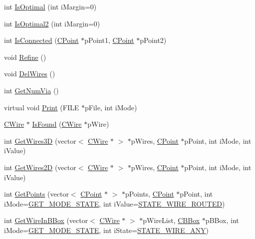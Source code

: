 \begin{DoxyCompactItemize}
\item 
int \mbox{\hyperlink{classCNet_af4f036ca5e1729d4d85130547b7d0e85}{Is\+Optimal}} (int i\+Margin=0)
\item 
int \mbox{\hyperlink{classCNet_adcd99220d0eb0a6c4f64577ff57a010e}{Is\+Optimal2}} (int i\+Margin=0)
\item 
int \mbox{\hyperlink{classCNet_a911d486b626482b3893076ec39c312e6}{Is\+Connected}} (\mbox{\hyperlink{classCPoint}{C\+Point}} $\ast$p\+Point1, \mbox{\hyperlink{classCPoint}{C\+Point}} $\ast$p\+Point2)
\item 
void \mbox{\hyperlink{classCNet_ab63bb6fcabe98cabe6c02f525c937aec}{Refine}} ()
\item 
void \mbox{\hyperlink{classCNet_a5836b8ada69984cf346e6a41bd536b86}{Del\+Wires}} ()
\item 
int \mbox{\hyperlink{classCNet_abd9060bc972528e75eb26cabeceba261}{Get\+Num\+Via}} ()
\item 
virtual void \mbox{\hyperlink{classCNet_a94a51f1ccadf689a3bcfa167f37e12f5}{Print}} (F\+I\+LE $\ast$p\+File, int i\+Mode)
\item 
\mbox{\hyperlink{classCWire}{C\+Wire}} $\ast$ \mbox{\hyperlink{classCNet_a4181ad889db799bacf35c59e96890311}{Is\+Found}} (\mbox{\hyperlink{classCWire}{C\+Wire}} $\ast$p\+Wire)
\item 
int \mbox{\hyperlink{classCNet_a8c0924224990fa0de1c90a8d94c046e0}{Get\+Wires3D}} (vector$<$ \mbox{\hyperlink{classCWire}{C\+Wire}} $\ast$ $>$ $\ast$p\+Wires, \mbox{\hyperlink{classCPoint}{C\+Point}} $\ast$p\+Point, int i\+Mode, int i\+Value)
\item 
int \mbox{\hyperlink{classCNet_aa70dfc4170e25b64e56a85ef95691b86}{Get\+Wires2D}} (vector$<$ \mbox{\hyperlink{classCWire}{C\+Wire}} $\ast$ $>$ $\ast$p\+Wires, \mbox{\hyperlink{classCPoint}{C\+Point}} $\ast$p\+Point, int i\+Mode, int i\+Value)
\item 
int \mbox{\hyperlink{classCNet_a72e98de5efdbafd034130d0711de4951}{Get\+Points}} (vector$<$ \mbox{\hyperlink{classCPoint}{C\+Point}} $\ast$ $>$ $\ast$p\+Points, \mbox{\hyperlink{classCPoint}{C\+Point}} $\ast$p\+Point, int i\+Mode=\mbox{\hyperlink{BoxRouter_8h_a6f72f2cc9dd31793dd832ccfb2547de4}{G\+E\+T\+\_\+\+M\+O\+D\+E\+\_\+\+S\+T\+A\+TE}}, int i\+Value=\mbox{\hyperlink{BoxRouter_8h_a4bee041256f62f94c8f451efa0aaabf9}{S\+T\+A\+T\+E\+\_\+\+W\+I\+R\+E\+\_\+\+R\+O\+U\+T\+ED}})
\item 
int \mbox{\hyperlink{classCNet_a885207dedf1b08d52638bda17ba12227}{Get\+Wire\+In\+B\+Box}} (vector$<$ \mbox{\hyperlink{classCWire}{C\+Wire}} $\ast$ $>$ $\ast$p\+Wire\+List, \mbox{\hyperlink{classCBBox}{C\+B\+Box}} $\ast$p\+B\+Box, int i\+Mode=\mbox{\hyperlink{BoxRouter_8h_a6f72f2cc9dd31793dd832ccfb2547de4}{G\+E\+T\+\_\+\+M\+O\+D\+E\+\_\+\+S\+T\+A\+TE}}, int i\+State=\mbox{\hyperlink{BoxRouter_8h_a1b285251edd87e1423189470586cc719}{S\+T\+A\+T\+E\+\_\+\+W\+I\+R\+E\+\_\+\+A\+NY}})

\end{DoxyCompactItemize}
